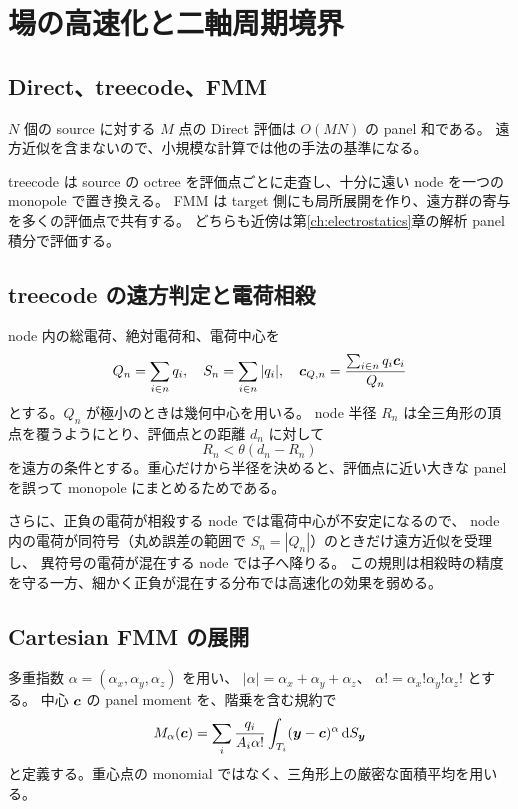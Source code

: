 \chapter{場の高速化と二軸周期境界}
\label{ch:field}

\section{Direct、treecode、FMM}
$N$ 個の source に対する $M$ 点の Direct 評価は $O(MN)$ の panel 和である。
遠方近似を含まないので、小規模な計算では他の手法の基準になる。

treecode は source の octree を評価点ごとに走査し、十分に遠い node を一つの monopole で置き換える\citep{BarnesHut1986}。
FMM は target 側にも局所展開を作り、遠方群の寄与を多くの評価点で共有する\citep{GreengardRokhlin1987}。
どちらも近傍は第\ref{ch:electrostatics}章の解析 panel 積分で評価する。

\section{treecode の遠方判定と電荷相殺}
node 内の総電荷、絶対電荷和、電荷中心を
\begin{equation}
 Q_n=\sum_{i\in n}q_i,\quad S_n=\sum_{i\in n}|q_i|,\quad
 \bm{c}_{Q,n}=\frac{\sum_{i\in n}q_i\bm{c}_i}{Q_n}
\end{equation}
とする。$Q_n$ が極小のときは幾何中心を用いる。
node 半径 $R_n$ は全三角形の頂点を覆うようにとり、評価点との距離 $d_n$ に対して
\begin{equation}
 R_n<\theta(d_n-R_n)
\end{equation}
を遠方の条件とする。重心だけから半径を決めると、評価点に近い大きな panel を誤って monopole にまとめるためである。

さらに、正負の電荷が相殺する node では電荷中心が不安定になるので、
node 内の電荷が同符号（丸め誤差の範囲で $S_n=|Q_n|$）のときだけ遠方近似を受理し、
異符号の電荷が混在する node では子へ降りる。
この規則は相殺時の精度を守る一方、細かく正負が混在する分布では高速化の効果を弱める。

\section{Cartesian FMM の展開}
多重指数 $\alpha=(\alpha_x,\alpha_y,\alpha_z)$ を用い、
$|\alpha|=\alpha_x+\alpha_y+\alpha_z$、
$\alpha!=\alpha_x!\alpha_y!\alpha_z!$ とする。
中心 $\bm{c}$ の panel moment を、階乗を含む規約で
\begin{equation}
 M_\alpha(\bm{c})
 =\sum_i\frac{q_i}{A_i\alpha!}
   \int_{T_i}(\bm{y}-\bm{c})^\alpha\mathop{}\!\mathrm{d} S_{\bm{y}}
 \label{eq:panel_moment}
\end{equation}
と定義する。重心点の monomial ではなく、三角形上の厳密な面積平均を用いる。

